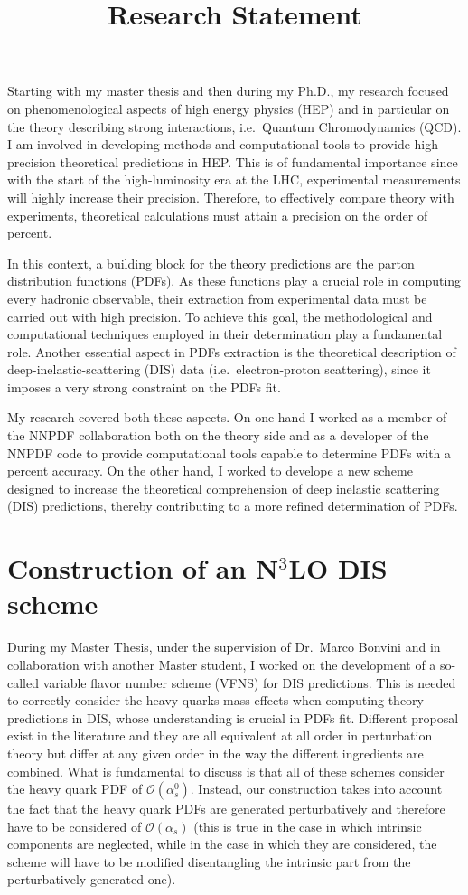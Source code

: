 \documentclass[11pt,a4paper]{moderncv}        %
\title{Research Statement}
\begin{document}
\makecvtitle

Starting with my master thesis and then during my Ph.D., my research focused on phenomenological aspects of high energy physics (HEP)
and in particular on the theory describing strong interactions, i.e.\ Quantum Chromodynamics (QCD).
I am involved in developing methods and computational tools to provide high precision theoretical predictions in HEP.
This is of fundamental importance since with the start of the high-luminosity era at the LHC, experimental measurements will highly 
increase their precision.
Therefore, to effectively compare theory with experiments, theoretical calculations must attain a precision on the order of percent.

In this context, a building block for the theory predictions are the parton distribution functions (PDFs).
As these functions play a crucial role in computing every hadronic observable, their extraction from
experimental data must be carried out with high precision.
To achieve this goal, the methodological and computational techniques employed in their determination play a fundamental role. 
Another essential aspect in PDFs extraction is the theoretical description of deep-inelastic-scattering (DIS) data (i.e.\ electron-proton
scattering), since it imposes a very strong constraint on the PDFs fit.

My research covered both these aspects.
On one hand I worked as a member of the NNPDF collaboration both on the theory side and as a developer of the NNPDF code to provide
computational tools capable to determine PDFs with a percent accuracy.
On the other hand, I worked to develope a new scheme designed to increase the theoretical comprehension of deep inelastic scattering
(DIS) predictions, thereby contributing to a more refined determination of PDFs.

\section{Construction of an N$^3$LO DIS scheme}

During my Master Thesis, under the supervision of Dr.\ Marco Bonvini and in collaboration with another Master student,
I worked on the development of a so-called variable flavor number scheme (VFNS) for DIS predictions.
This is needed to correctly consider the heavy quarks mass effects when computing theory predictions in DIS,
whose understanding is crucial in PDFs fit.
Different proposal exist in the literature and they are all equivalent at all order in perturbation theory but differ at any given
order in the way the different ingredients are combined.
What is fundamental to discuss is that all of these schemes consider the heavy quark PDF of $\mathcal{O}(\alpha_s^0)$.
Instead, our construction takes into account the fact that the heavy quark PDFs are generated
perturbatively and therefore have to be considered of $\mathcal{O}(\alpha_s)$ (this is true in the case in which intrinsic components
are neglected, while in the case in which they are considered, the scheme will
have to be modified disentangling the intrinsic part from the perturbatively generated one).
\end{document}
